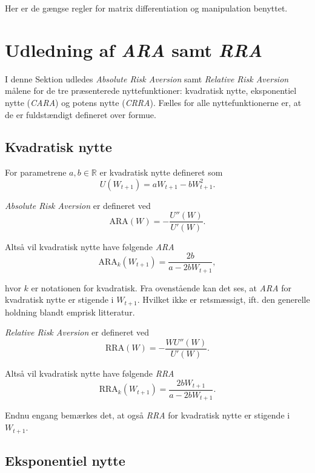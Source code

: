 \documentclass[
  a4paper,
  oneside]{memoir}
\begin{document}
Her er de gængse regler for matrix differentiation og manipulation benyttet.

\hypertarget{udledning-af-ara-samt-rra}{%
\section{\texorpdfstring{Udledning af \emph{ARA} samt \emph{RRA}}{Udledning af ARA samt RRA}}\label{udledning-af-ara-samt-rra}}

I denne Sektion udledes \emph{Absolute Risk Aversion} samt \emph{Relative Risk Aversion} målene for de tre præsenterede nyttefunktioner: kvadratisk nytte, eksponentiel nytte (\emph{CARA}) og potens nytte (\emph{CRRA}). Fælles for alle nyttefunktionerne er, at de er fuldstændigt defineret over formue.

\hypertarget{kvadratisk-nytte-1}{%
\subsection{Kvadratisk nytte}\label{kvadratisk-nytte-1}}

For parametrene \(a,b\in\mathbb{R}\) er kvadratisk nytte defineret som
\begin{equation*}
U(W_{t+1})=aW_{t+1}-bW_{t+1}^2.
\end{equation*}

\emph{Absolute Risk Aversion} er defineret ved
\[\text{ARA}(W)=-\frac{U''(W)}{U'(W)}.\]

Altså vil kvadratisk nytte have følgende \emph{ARA}
\[\text{ARA}_k(W_{t+1})=\frac{2b}{a-2bW_{t+1}},\]

hvor \(k\) er notationen for kvadratisk. Fra ovenstående kan det ses, at \emph{ARA} for kvadratisk nytte er stigende i \(W_{t+1}\). Hvilket ikke er retsmæssigt, ift. den generelle holdning blandt emprisk litteratur.

\emph{Relative Risk Aversion} er defineret ved
\[\text{RRA}(W)=-\frac{WU''(W)}{U'(W)}.\]

Altså vil kvadratisk nytte have følgende \emph{RRA}
\[\text{RRA}_k(W_{t+1})= \frac{2bW_{t+1}}{a-2bW_{t+1}}.\]

Endnu engang bemærkes det, at også \emph{RRA} for kvadratisk nytte er stigende i \(W_{t+1}\).

\hypertarget{eksponentiel-nytte-1}{%
\subsection{Eksponentiel nytte}\label{eksponentiel-nytte-1}}
\end{document}
